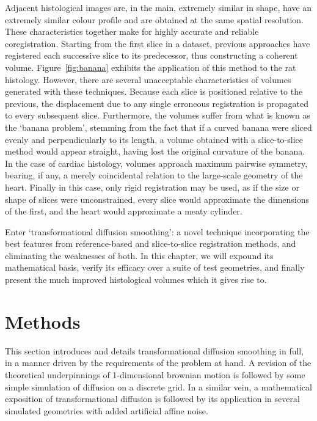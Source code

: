   Adjacent histological images are, in the main, extremely similar in shape, have an extremely similar colour profile and are obtained at the same spatial resolution. These characteristics together make for highly accurate and reliable coregistration. Starting from the first slice in a dataset, previous approaches have registered each successive slice to its predecessor, thus constructing a coherent volume. Figure~\ref{fig:banana} exhibits the application of this method to the rat histology. However, there are several unacceptable characteristics of volumes generated with these techniques. Because each slice is positioned relative to the previous, the displacement due to any single erroneous registration is propagated to every subsequent slice. Furthermore, the volumes suffer from what is known as the `banana problem', stemming from the fact that if a curved banana were sliced evenly and perpendicularly to its length, a volume obtained with a slice-to-slice method would appear straight, having lost the original curvature of the banana. In the case of cardiac histology, volumes approach maximum pairwise symmetry, bearing, if any, a merely coincidental relation to the large-scale geometry of the heart. Finally in this case, only rigid registration may be used, as if the size or shape of slices were unconstrained, every slice would approximate the dimensions of the first, and the heart would approximate a meaty cylinder.
  
  Enter `transformational diffusion smoothing': a novel technique incorporating the best features from reference-based and slice-to-slice registration methods, and eliminating the weaknesses of both. In this chapter, we will expound its mathematical basis, verify its efficacy over a suite of test geometries, and finally present the much improved histological volumes which it gives rise to.
    

\section{Methods} %
\label{sec:methods}
  This section introduces and details transformational diffusion smoothing in full, in a manner driven by the requirements of the problem at hand. A revision of the theoretical underpinnings of 1-dimensional brownian motion is followed by some simple simulation of diffusion on a discrete grid. In a similar vein, a mathematical exposition of transformational diffusion is followed by its application in several simulated geometries with added artificial affine noise.
  

